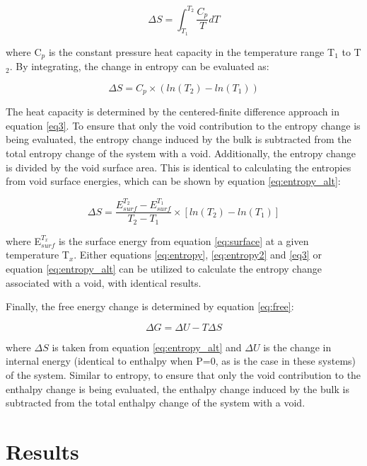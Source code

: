\documentclass[review]{elsarticle}
\begin{document}
\begin{equation}
\label{eq:entropy}
\Delta S = \int_{T_{1}}^{T_{2}} \frac{C_{p}}{T} dT
\end{equation}

where C$_{p}$ is the constant pressure heat capacity in the temperature range T$_{1}$ to T$_{2}$. By integrating, the change in entropy can be evaluated as:

\begin{equation}
\label{eq:entropy2}
\Delta S = C_{p} \times (ln(T_{2}) - ln(T_{1})) 
\end{equation}

The heat capacity is determined by the centered-finite difference approach in equation \ref{eq3}. To ensure that only the void contribution to the entropy change is being evaluated, the entropy change induced by the bulk is subtracted from the total entropy change of the system with a void. Additionally, the entropy change is divided by the void surface area. This is identical to calculating the entropies from void surface energies, which can be shown by equation \ref{eq:entropy_alt}:

\begin{equation}
\label{eq:entropy_alt}
\Delta S =\frac{ E_{surf}^{T_2} - E_{surf}^{T_1}}{T_2 - T_1} \times [ ln(T_2) - ln(T_1) ]
\end{equation}

where E$_{surf}^{T_{x}}$ is the surface energy from equation \ref{eq:surface} at a given temperature T$_x$. Either equations \ref{eq:entropy}, \ref{eq:entropy2} and \ref{eq3} or equation \ref{eq:entropy_alt} can be utilized to calculate the entropy change associated with a void, with identical results. 

Finally, the free energy change is determined by equation \ref{eq:free}:

\begin{equation}
\label{eq:free}
\Delta G = \Delta U - T \Delta S
\end{equation}

where $\Delta S$ is taken from equation \ref{eq:entropy_alt} and $\Delta U$ is the change in internal energy (identical to enthalpy when P=0, as is the case in these systems) of the system. Similar to entropy, to ensure that only the void contribution to the enthalpy change is being evaluated, the enthalpy change induced by the bulk is subtracted from the total enthalpy change of the system with a void.


\section{Results}
\end{document}
